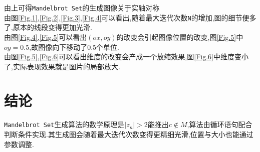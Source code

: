 \documentclass[a4paper]{ctexart}
\begin{document}
由上可得\verb|Mandelbrot Set|的生成图像关于实轴对称\\
由图\ref{Fig.1},\ref{Fig.2},\ref{Fig.3},\ref{Fig.4}可以看出,随着最大迭代次数\verb|N|的增加,图的细节便多了,原本的线段变得更加光滑.\\
由图\ref{Fig.4},\ref{Fig.5}可以看出$(ox,oy)$的改变会引起图像位置的改变,图\ref{Fig.5}中$oy=0.5$,故图像向下移动了$0.5$个单位.\\
由图\ref{Fig.5},\ref{Fig.6}可以看出维度的改变会产成一个放缩效果,图\ref{Fig.6}中维度变小了,实际表现效果就是图片的局部放大.

\section{结论}
\verb|Mandelbrot Set|生成算法的数学原理是$|z_n|>2$能推出$c \notin M$,算法由循环语句配合判断条件实现.其生成图会随着最大迭代次数变得更精细光滑,位置与大小也能通过参数调整.


\end{document}
